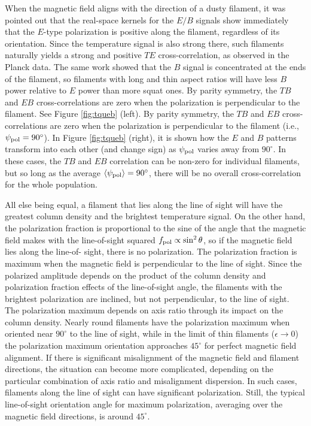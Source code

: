 \documentclass[a4paper,10pt]{article}
\begin{document}
{\noindent}When the magnetic field aligns with the direction of a dusty filament, it was pointed out that the real-space kernels for the $E/B$ signals show immediately that the $E$-type polarization is positive along the filament, regardless of its orientation. Since the temperature signal is also strong there, such filaments naturally yields a strong and positive $TE$ cross-correlation, as observed in the Planck data. The same work showed that the $B$ signal is concentrated at the ends of the filament, so filaments with long and thin aspect ratios will have less $B$ power relative to $E$ power than more squat ones. By parity symmetry, the $TB$ and $EB$ cross-correlations are zero when the polarization is perpendicular to the filament. See Figure \ref{fig:tqueb} (left). By parity symmetry, the $TB$ and $EB$ cross-correlations are zero when the polarization is perpendicular to the filament (i.e., $\psi_{\rm pol}=90^\circ$). In Figure \ref{fig:tqueb} (right), it is shown how the $E$ and $B$ patterns transform into each other (and change sign) as $\psi_{\rm pol}$ varies away from $90^\circ$. In these cases, the $TB$ and $EB$ correlation can be non-zero for individual filaments, but so long as the average $\langle\psi_{\rm pol}\rangle=90^\circ$, there will be no overall cross-correlation for the whole population.

{\noindent}All else being equal, a filament that lies along the line of sight will have the greatest column density and the brightest temperature signal. On the other hand, the polarization fraction is proportional to the sine of the angle that the magnetic field makes with the line-of-sight squared $f_{\rm pol}\propto\sin^2\theta$, so if the magnetic field lies along the line-of- sight, there is no polarization. The polarization fraction is maximum when the magnetic field is perpendicular to the line of sight. Since the polarized amplitude depends on the product of the column density and polarization fraction effects of the line-of-sight angle, the filaments with the brightest polarization are inclined, but not perpendicular, to the line of sight. The polarization maximum depends on axis ratio through its impact on the column density. Nearly round filaments have the polarization maximum when oriented near $90^\circ$ to the line of sight, while in the limit of thin filaments ($\epsilon\rightarrow0$) the polarization maximum orientation approaches $45^\circ$ for perfect magnetic field alignment. If there is significant misalignment of the magnetic field and filament directions, the situation can become more complicated, depending on the particular combination of axis ratio and misalignment dispersion. In such cases, filaments along the line of sight can have significant polarization. Still, the typical line-of-sight orientation angle for maximum polarization, averaging over the magnetic field directions, is around $45^\circ$.
\end{document}
